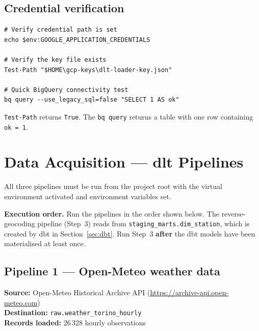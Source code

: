 \documentclass[11pt,a4paper]{article}
\begin{document}
\subsection{Credential verification}

\begin{lstlisting}[style=shell]
# Verify credential path is set
echo $env:GOOGLE_APPLICATION_CREDENTIALS

# Verify the key file exists
Test-Path "$HOME\gcp-keys\dlt-loader-key.json"

# Quick BigQuery connectivity test
bq query --use_legacy_sql=false "SELECT 1 AS ok"
\end{lstlisting}

\begin{tcolorbox}[successbox,title=Expected output]
\texttt{Test-Path} returns \texttt{True}.
The \texttt{bq query} returns a table with one row containing \texttt{ok = 1}.
\end{tcolorbox}

\section{Data Acquisition — dlt Pipelines}

All three pipelines must be run from the project root with the virtual environment
activated and environment variables set.

\begin{tcolorbox}[infobox]
\textbf{Execution order.}
Run the pipelines in the order shown below.
The reverse-geocoding pipeline (Step~3) reads from \texttt{staging\_marts.dim\_station},
which is created by dbt in Section~\ref{sec:dbt}.
Run Step~3 \textbf{after} the dbt models have been materialised at least once.
\end{tcolorbox}

\subsection{Pipeline 1 — Open-Meteo weather data}

\textbf{Source:} Open-Meteo Historical Archive API (\url{https://archive-api.open-meteo.com})\\
\textbf{Destination:} \texttt{raw.weather\_torino\_hourly}\\
\textbf{Records loaded:} 26\,328 hourly observations
\end{document}
